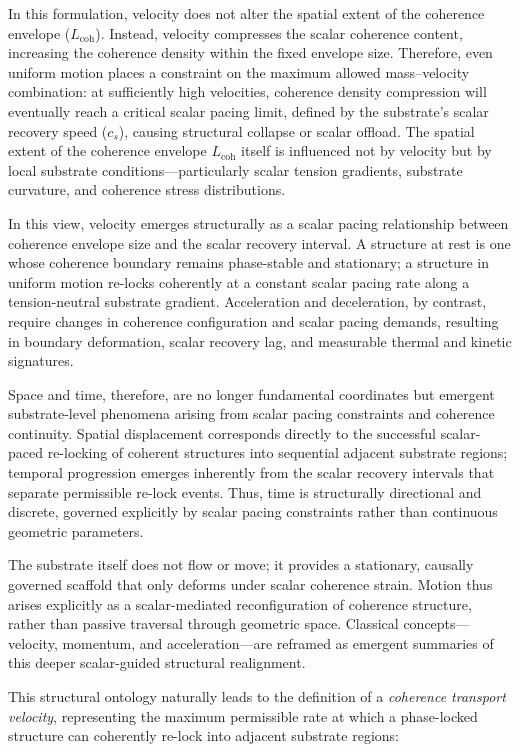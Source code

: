 \documentclass[preprints,article,submit,pdftex,moreauthors]{Definitions/mdpi}
\begin{document}
In this formulation, velocity does not alter the spatial extent of the coherence envelope ($L_{\text{coh}}$). Instead, velocity compresses the scalar coherence content, increasing the coherence density within the fixed envelope size. Therefore, even uniform motion places a constraint on the maximum allowed mass--velocity combination: at sufficiently high velocities, coherence density compression will eventually reach a critical scalar pacing limit, defined by the substrate's scalar recovery speed ($c_s$), causing structural collapse or scalar offload. The spatial extent of the coherence envelope $L_{\text{coh}}$ itself is influenced not by velocity but by local substrate conditions—particularly scalar tension gradients, substrate curvature, and coherence stress distributions.

In this view, velocity emerges structurally as a scalar pacing relationship between coherence envelope size and the scalar recovery interval. A structure at rest is one whose coherence boundary remains phase-stable and stationary; a structure in uniform motion re-locks coherently at a constant scalar pacing rate along a tension-neutral substrate gradient. Acceleration and deceleration, by contrast, require changes in coherence configuration and scalar pacing demands, resulting in boundary deformation, scalar recovery lag, and measurable thermal and kinetic signatures.

Space and time, therefore, are no longer fundamental coordinates but emergent substrate-level phenomena arising from scalar pacing constraints and coherence continuity. Spatial displacement corresponds directly to the successful scalar-paced re-locking of coherent structures into sequential adjacent substrate regions; temporal progression emerges inherently from the scalar recovery intervals that separate permissible re-lock events. Thus, time is structurally directional and discrete, governed explicitly by scalar pacing constraints rather than continuous geometric parameters.

The substrate itself does not flow or move; it provides a stationary, causally governed scaffold that only deforms under scalar coherence strain. Motion thus arises explicitly as a scalar-mediated reconfiguration of coherence structure, rather than passive traversal through geometric space. Classical concepts—velocity, momentum, and acceleration—are reframed as emergent summaries of this deeper scalar-guided structural realignment.

This structural ontology naturally leads to the definition of a \emph{coherence transport velocity}, representing the maximum permissible rate at which a phase-locked structure can coherently re-lock into adjacent substrate regions:
\end{document}

